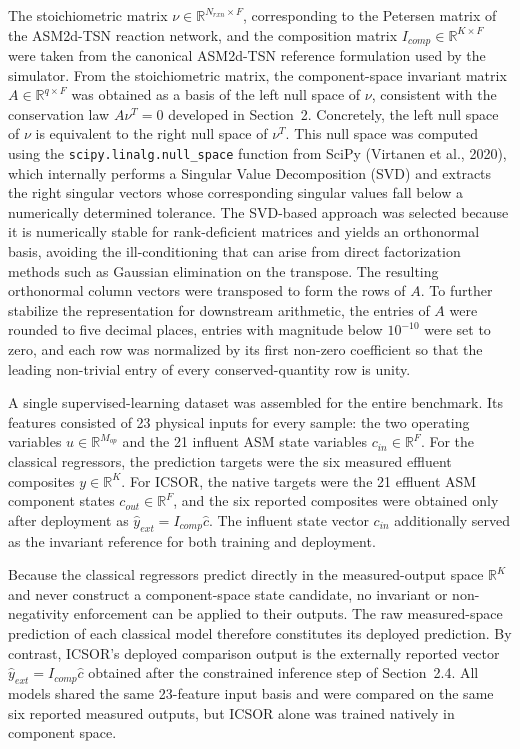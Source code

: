 \documentclass[11pt]{article}
\begin{document}
The stoichiometric matrix $\nu \in \mathbb{R}^{N_{rxn} \times F}$, corresponding to the Petersen matrix of the ASM2d-TSN reaction network, and the composition matrix $I_{comp} \in \mathbb{R}^{K \times F}$ were taken from the canonical ASM2d-TSN reference formulation used by the simulator. From the stoichiometric matrix, the component-space invariant matrix $A \in \mathbb{R}^{q \times F}$ was obtained as a basis of the left null space of $\nu$, consistent with the conservation law $A\nu^T = 0$ developed in Section~2. Concretely, the left null space of $\nu$ is equivalent to the right null space of $\nu^T$. This null space was computed using the \texttt{scipy.linalg.null\_space} function from SciPy (Virtanen et al., 2020), which internally performs a Singular Value Decomposition (SVD) and extracts the right singular vectors whose corresponding singular values fall below a numerically determined tolerance. The SVD-based approach was selected because it is numerically stable for rank-deficient matrices and yields an orthonormal basis, avoiding the ill-conditioning that can arise from direct factorization methods such as Gaussian elimination on the transpose. The resulting orthonormal column vectors were transposed to form the rows of $A$. To further stabilize the representation for downstream arithmetic, the entries of $A$ were rounded to five decimal places, entries with magnitude below $10^{-10}$ were set to zero, and each row was normalized by its first non-zero coefficient so that the leading non-trivial entry of every conserved-quantity row is unity.

A single supervised-learning dataset was assembled for the entire benchmark. Its features consisted of 23 physical inputs for every sample: the two operating variables $u \in \mathbb{R}^{M_{op}}$ and the 21 influent ASM state variables $c_{in} \in \mathbb{R}^{F}$. For the classical regressors, the prediction targets were the six measured effluent composites $y \in \mathbb{R}^{K}$. For ICSOR, the native targets were the 21 effluent ASM component states $c_{out} \in \mathbb{R}^{F}$, and the six reported composites were obtained only after deployment as $\hat{y}_{ext} = I_{comp}\hat{c}$. The influent state vector $c_{in}$ additionally served as the invariant reference for both training and deployment.

Because the classical regressors predict directly in the measured-output space $\mathbb{R}^K$ and never construct a component-space state candidate, no invariant or non-negativity enforcement can be applied to their outputs. The raw measured-space prediction of each classical model therefore constitutes its deployed prediction. By contrast, ICSOR's deployed comparison output is the externally reported vector $\hat{y}_{ext} = I_{comp}\hat{c}$ obtained after the constrained inference step of Section~2.4. All models shared the same 23-feature input basis and were compared on the same six reported measured outputs, but ICSOR alone was trained natively in component space.
\end{document}
